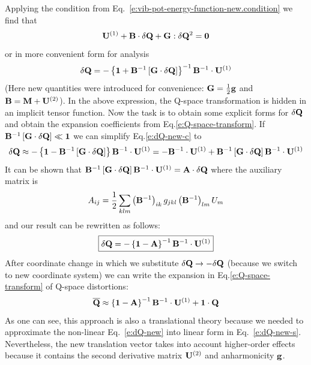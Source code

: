 \documentclass[a4paper,titlepage,twoside,fleqn,12pt]{book}
\begin{document}
\begin{refsection}
Applying the condition from Eq.~\eqref{e:vib-pot-energy-function-new.condition} we find that
%
\begin{equation}\label{e:dQ-new}
{\bf U}^{(1)} + {\bf B} \cdot \delta {\bf Q} + {\bf G} : \delta{\bf Q}^2 = {\bf 0}
\end{equation}
%
or in more convenient form for analysis
%
\begin{equation}\label{e:dQ-new-c}
\delta {\bf Q} = 
-\left\{ 
       {\bf 1} + {\bf B}^{-1} \left[ {\bf G} \cdot \delta {\bf Q} \right]
\right\}^{-1} {\bf B}^{-1} \cdot {\bf U}^{(1)}
\end{equation}
%
(Here new quantities were introduced for convenience: ${\bf G} = \frac{1}{2} {\bf g}$
and ${\bf B} = {\bf M} + {\bf U}^{(2)}$). 
In the above expression, the Q-space transformation is hidden in an implicit tensor
function.
Now the task is to obtain some explicit forms for $\delta {\bf Q}$ and
obtain the expansion coefficients from Eq.\eqref{e:Q-space-transform}.
%
If~${\bf B}^{-1} \left[ {\bf G} \cdot \delta {\bf Q} \right] \ll {\bf 1} $ 
we can simplify Eq.\eqref{e:dQ-new-c} to
%
\begin{equation}\label{e:dQ-new-s}
\delta {\bf Q} \approx
-\left\{ 
       {\bf 1} - {\bf B}^{-1} \left[ {\bf G} \cdot \delta {\bf Q} \right]
\right\} {\bf B}^{-1} \cdot {\bf U}^{(1)} = 
%
- {\bf B}^{-1} \cdot {\bf U}^{(1)} + {\bf B}^{-1} \left[ {\bf G} \cdot \delta {\bf Q} \right] {\bf B}^{-1} \cdot {\bf U}^{(1)}
\end{equation}
%
It can be shown that 
${\bf B}^{-1} \left[ {\bf G} \cdot \delta {\bf Q} \right] {\bf B}^{-1} \cdot {\bf U}^{(1)} = {\bf A} \cdot \delta {\bf Q}$
where the auxiliary matrix is
%
\begin{equation}\label{e:A}
A_{ij} = \frac{1}{2}\sum_{klm} 
   \left( {\bf B}^{-1} \right)_{ik} g_{jkl} \left( {\bf B}^{-1} \right)_{lm} 
U_m
\end{equation}
%
and our result can be rewritten as follows:
%
\begin{equation}\label{e:dQ-T1}
\boxed{
\delta {\bf Q} = -  \left\{ {\bf 1} - {\bf A} \right\}^{-1} {\bf B}^{-1} \cdot {\bf U}^{(1)}
}
\end{equation}
%
After coordinate change in which we substitute $\delta {\bf Q}\rightarrow -\delta {\bf Q}$
(because we switch to new coordinate system) we can write the expansion in Eq.\eqref{e:Q-space-transform} 
of Q-space distortions:
\begin{equation}\label{e:Q-new-T1}
{\bf \overline{Q}} \approx  \left\{ {\bf 1} - {\bf A} \right\}^{-1} {\bf B}^{-1} \cdot {\bf U}^{(1)} + {\bf 1} \cdot {\bf Q}
\end{equation}
%
As one can see, this approach is also a translational theory because 
we needed to approximate the non\hyp{}linear Eq.~\eqref{e:dQ-new} into
linear form in Eq.~\eqref{e:dQ-new-s}.
Nevertheless, the new translation vector takes into account
higher\hyp{}order effects because it contains the second derivative matrix ${\bf U}^{(2)}$
and anharmonicity $\bf g$.


\end{refsection}
\end{document}
